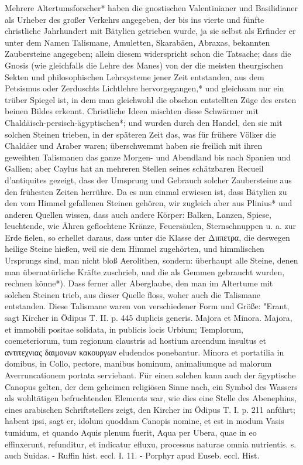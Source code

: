 \documentclass[a4paper, 11pt, oneside, polutonikogreek, german]{article}
\begin{document}
Mehrere Altertumsforscher* haben die gnostischen Valentinianer und Basilidianer als Urheber des großer Verkehrs angegeben, der bis ins vierte und fünfte christliche Jahrhundert mit Bätylien getrieben wurde, ja sie selbst als Erfinder er unter dem Namen Talismane, Amuletten, Skarabäen, Abraxas, bekannten Zaubersteine angegeben; allein diesem widerspricht schon die Tatsache; dass die Gnosis (wie gleichfalls die Lehre des Manes) von der die meisten theurgischen Sekten und philosophischen Lehrsysteme jener Zeit entstanden, aus dem Petsismus oder Zerduschts Lichtlehre hervorgegangen,* und gleichsam nur ein trüber Spiegel ist, in dem man gleichwohl die obschon entstellten Züge des ersten beinen Bildes erkennt. Christliche Ideen mischten diese Schwärmer mit Chaldäisch-persisch-ägyptischen*; und wurden durch den Handel, den sie mit solchen Steinen trieben, in der späteren Zeit das, was für frühere Völker die Chaldäer und Araber waren; überschwemmt haben sie freilich mit ihren geweihten Talismanen das ganze Morgen- und Abendland bis nach Spanien und Gallien; aber Caylus hat an mehreren Stellen seines schätzbaren Recueil d'antiquites gezeigt, dass der Umsprung und Gebrauch solcher Zaubersteine aus den frühesten Zeiten herrühre. Da es nun einmal erwiesen ist, dass Bätylien zu den vom Himmel gefallenen Steinen gehören, wir zugleich aber aus Plinius* und anderen Quellen wissen, dass auch andere Körper: Balken, Lanzen, Spiese, leuchtende, wie Ähren geflochtene Kränze, Feuersäulen, Sternschnuppen u. a. zur Erde fielen, so erhellet daraus, dass unter die Klasse der Διιπετρα, die deswegen heilige Steine hießen, weil sie dem Himmel zugehörten, und himmlischen Ursprungs sind, man nicht bloß Aerolithen, sondern: überhaupt alle Steine, denen man übernatürliche Kräfte zuschrieb, und die als Gemmen gebraucht wurden, rechnen könne*). Dass ferner aller Aberglaube, den man im Altertume mit solchen Steinen trieb, aus dieser Quelle floss, woher auch die Talismane entstanden. Diese Talismane waren von verschiedener Form und Größe: "Erant, sagt Kircher in Ödipus T. II. p. 445 duplicis generis. Majora et Minora. Majora, et immobili positae solidata, in publicis locis Urbium; Templorum, coemeteriorum, tum regionum claustris ad hostium arcendum insultus et αντιτεχνιας δαιμονων κακουργων eludendos ponebantur. Minora et portatilia in domibus, in Collo, pectore, manibus hominum, animaliumque ad malorum Averruncationem portata serviebant. Für einen solchen kann auch der ägyptische Canopus gelten, der dem geheimen religiösen Sinne nach, ein Symbol des Wassers als wohltätigen befruchtenden Elements war, wie dies eine Stelle des Abenephius, eines arabischen Schriftstellers zeigt, den Kircher im Ödipus T. I. p. 211 anführt; habent ipsi, sagt er, idolum quoddam Canopis nomine, et est in modum Vasis tumidum, et quando Aquis plenum fuerit, Aqua per Ubera, quae in eo effinxerunt, refunditur, et indicatur efluxu, processus naturae omnia nutrientis. s. auch Suidas. - Ruffin hist. eccl. I. 11. - Porphyr apud Euseb. eccl. Hist.
\end{document}
